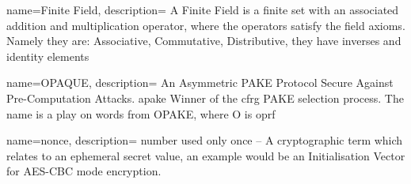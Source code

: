  {
  name={Finite Field},
  description={
    A Finite Field is a finite set with an associated addition and multiplication operator, where the operators satisfy the field axioms. Namely they are: Associative, Commutative, Distributive, they have inverses and identity elements%
  }
}

 {
  name={OPAQUE},
  description={
    An Asymmetric PAKE Protocol Secure Against Pre-Computation Attacks.
    \gls{apake} Winner of the \gls{cfrg} PAKE selection process.
    The name is a play on words from OPAKE, where O is \gls{oprf}%
  }
}

 {
  name={nonce},
  description={
    number used only once -- A cryptographic term which relates to an ephemeral secret value, an example would be an Initialisation Vector for AES-CBC mode encryption.
  }
}

